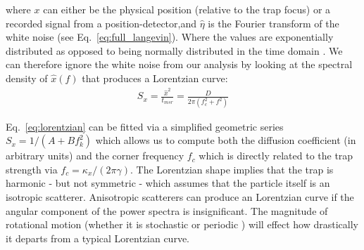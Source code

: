 where $x$ can either be the physical position (relative to the trap
focus) or a recorded signal from a position-detector,and $\hat{\eta}$ 
is the Fourier transform of the white noise (see Eq.~\eqref{eq:full_langevin}). 
Where the values are exponentially distributed as opposed to being 
normally distributed in the time domain \cite{BergSoerensen2004}.
We can therefore ignore the white noise from our analysis by looking 
at the spectral density of $\hat{x}(f)$ that produces a Lorentzian
curve: 
\begin{align}
	\label{eq:lorentzian}
	S_x = \frac{\hat{x}^2}{t_{msr}} = \frac{D}{2\pi(f_c^2+f^2)}
\end{align}
 

Eq.~\eqref{eq:lorentzian} can be fitted via a simplified geometric 
series $S_x = 1/(A+Bf_k^2)$ which allows us to compute both the 
diffusion coefficient (in arbitrary units) and the corner frequency 
$f_c$ which is directly related to the trap strength via $f_c = 
\kappa_x/(2\pi\gamma)$. The Lorentzian shape implies that the trap 
is harmonic - but not symmetric - which assumes that the particle 
itself is an isotropic scatterer. Anisotropic scatterers can 
produce an Lorentzian curve if the angular component of the power
spectra is insignificant. The magnitude of rotational motion 
(whether it is stochastic \cite{Bang2020} or periodic 
\cite{Yogesha2012}) will effect how drastically it departs from a 
typical Lorentzian curve.

